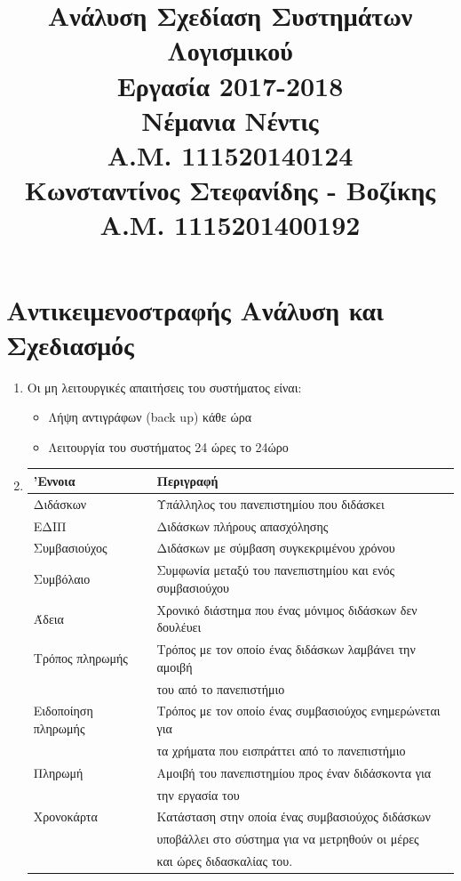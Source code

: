 \documentclass[12pt]{article}
\title{{Ανάλυση Σχεδίαση Συστημάτων Λογισμικού} \\
\vspace{2cm}
{\Huge Εργασία 2017-2018} \\
\vspace{2cm}
{Νέμανια Νέντις}\\
{Α.Μ. 111520140124}\\
{Κωνσταντίνος Στεφανίδης - Βοζίκης}\\
{Α.Μ. 1115201400192}}
\date{}
\begin{document}
\maketitle
\newpage
\tableofcontents
\newpage

\section{Αντικειμενοστραφής Ανάλυση και Σχεδιασμός}
\begin{enumerate}
\item
Οι μη λειτουργικές απαιτήσεις του συστήματος είναι:
\begin{itemize}
\item
Λήψη αντιγράφων (\textlatin{back up}) κάθε ώρα
\item
Λειτουργία του συστήματος 24 ώρες το 24ώρο
\end{itemize}
\item
\begin{tabular}{|l|l|}
\hline
'Εννοια & Περιγραφή \\
\hline
Διδάσκων & Υπάλληλος του πανεπιστημίου που διδάσκει \\
\hline
ΕΔΙΠ & Διδάσκων πλήρους απασχόλησης \\
\hline
Συμβασιούχος & Διδάσκων με σύμβαση συγκεκριμένου χρόνου \\
\hline
Συμβόλαιο & Συμφωνία μεταξύ του πανεπιστημίου και ενός συμβασιούχου \\
\hline
Άδεια & Χρονικό διάστημα που ένας μόνιμος διδάσκων δεν δουλέυει \\ 
\hline
Τρόπος πληρωμής & Τρόπος με τον οποίο ένας διδάσκων λαμβάνει την αμοιβή \\ 
& του από το πανεπιστήμιο \\
\hline
Ειδοποίηση πληρωμής & Τρόπος με τον οποίο ένας συμβασιούχος ενημερώνεται για \\
 & τα χρήματα που εισπράττει από το πανεπιστήμιο \\
\hline
Πληρωμή & Αμοιβή του πανεπιστημίου προς έναν διδάσκοντα για \\ 
& την εργασία του \\ 
\hline
Χρονοκάρτα & Κατάσταση στην οποία ένας συμβασιούχος διδάσκων \\
 & υποβάλλει στο σύστημα για να μετρηθούν οι μέρες \\
 &  και ώρες διδασκαλίας του. \\
\hline
\end{tabular}


\end{enumerate}
\end{document}
